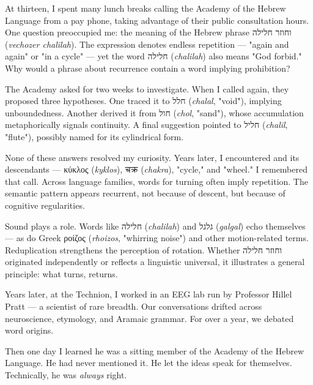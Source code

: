 \begin{commentary}
At thirteen, I spent many lunch breaks calling the Academy of the Hebrew Language from a pay phone, taking advantage of their public consultation hours. One question preoccupied me: the meaning of the Hebrew phrase \texthebrew{וחוזר חלילה} (\emph{vechozer chalilah}). The expression denotes endless repetition — "again and again" or "in a cycle" — yet the word \texthebrew{חלילה} (\emph{chalilah}) also means "God forbid." Why would a phrase about recurrence contain a word implying prohibition?

The Academy asked for two weeks to investigate. When I called again, they proposed three hypotheses. One traced it to \texthebrew{חלל} (\emph{chalal}, "void"), implying unboundedness. Another derived it from \texthebrew{חול} (\emph{chol}, "sand"), whose accumulation metaphorically signals continuity. A final suggestion pointed to \texthebrew{חליל} (\emph{chalil}, "flute"), possibly named for its cylindrical form.

None of these answers resolved my curiosity. Years later, I encountered  and its descendants — \textgreek{κύκλος} (\emph{kyklos}), \textsanskrit{चक्र} (\emph{chakra}), "cycle," and "wheel." I remembered that call. Across language families, words for turning often imply repetition. The semantic pattern appears recurrent, not because of descent, but because of cognitive regularities.

Sound plays a role. Words like \texthebrew{חלילה} (\emph{chalilah}) and \texthebrew{גלגל} (\emph{galgal}) echo themselves — as do Greek \textgreek{ροίζος} (\emph{rhoizos}, "whirring noise") and other motion-related terms. Reduplication strengthens the perception of rotation. Whether \texthebrew{וחוזר חלילה} originated independently or reflects a linguistic universal, it illustrates a general principle: what turns, returns.

Years later, at the Technion, I worked in an EEG lab run by Professor Hillel Pratt — a scientist of rare breadth. Our conversations drifted across neuroscience, etymology, and Aramaic grammar. For over a year, we debated word origins.

Then one day I learned he was a sitting member of the Academy of the Hebrew Language. He had never mentioned it. He let the ideas speak for themselves. Technically, he was \textit{always} right.
\end{commentary}

